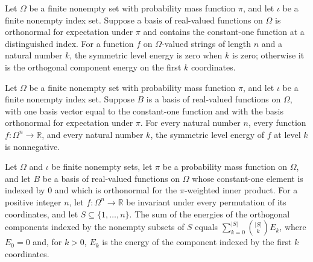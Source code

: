 \begin{definition}
\label{FABL.FiniteFourierBasis.symmetricLevelEnergy}
\leanok
{}
Let $\Omega$ be a finite nonempty set with probability mass function $\pi$, and let
$\iota$ be a finite nonempty index set. Suppose a basis of real-valued functions on
$\Omega$ is orthonormal for expectation under $\pi$ and contains the constant-one
function at a distinguished index. For a function $f$ on $\Omega$-valued strings of
length $n$ and a natural number $k$, the symmetric level energy is zero when $k$ is zero;
otherwise it is the orthogonal component energy on the first $k$ coordinates.
\end{definition}

\begin{theorem}
\label{FABL.FiniteFourierBasis.symmetricLevelEnergy_nonneg}
\leanok
{}
Let $\Omega$ be a finite nonempty set with probability mass function $\pi$, and let
$\iota$ be a finite nonempty index set. Suppose $B$ is a basis of real-valued functions
on $\Omega$, with one basis vector equal to the constant-one function and with the basis
orthonormal for expectation under $\pi$. For every natural number $n$, every function
$f:\Omega^n\to\mathbb{R}$, and every natural number $k$, the symmetric level energy of
$f$ at level $k$ is nonnegative.
\end{theorem}

\begin{theorem}
\label{FABL.FiniteFourierBasis.sum_energy_powerset_eq_sum_choose_levelEnergy}
\leanok
{}
Let $\Omega$ and $\iota$ be finite nonempty sets, let $\pi$ be a probability mass
function on $\Omega$, and let $B$ be a basis of real-valued functions on $\Omega$ whose
constant-one element is indexed by $0$ and which is orthonormal for the $\pi$-weighted
inner product. For a positive integer $n$, let $f:\Omega^n\to\mathbb R$ be invariant
under every permutation of its coordinates, and let $S\subseteq\{1,\ldots,n\}$. The sum
of the energies of the orthogonal components indexed by the nonempty subsets of $S$
equals $\sum_{k=0}^{|S|}\binom{|S|}{k} E_k$, where $E_0=0$ and, for $k>0$, $E_k$ is the
energy of the component indexed by the first $k$ coordinates.
\end{theorem}


